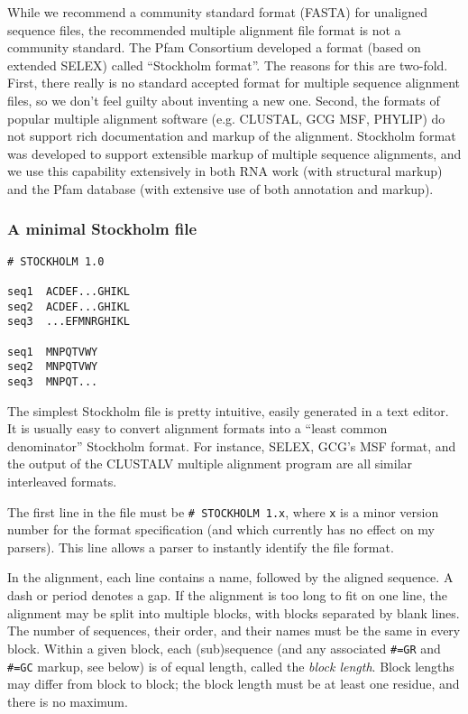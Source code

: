 While we recommend a community standard format (FASTA) for unaligned
sequence files, the recommended multiple alignment file format is not
a community standard.  The Pfam Consortium developed a format (based
on extended SELEX) called ``Stockholm format''.  The reasons for this
are two-fold. First, there really is no standard accepted format for
multiple sequence alignment files, so we don't feel guilty about
inventing a new one. Second, the formats of popular multiple alignment
software (e.g. CLUSTAL, GCG MSF, PHYLIP) do not support rich
documentation and markup of the alignment.  Stockholm format was
developed to support extensible markup of multiple sequence
alignments, and we use this capability extensively in both RNA work
(with structural markup) and the Pfam database (with extensive use of
both annotation and markup).

\subsubsection{A minimal Stockholm file}
\begin{verbatim}
# STOCKHOLM 1.0

seq1  ACDEF...GHIKL
seq2  ACDEF...GHIKL
seq3  ...EFMNRGHIKL

seq1  MNPQTVWY
seq2  MNPQTVWY
seq3  MNPQT...

\end{verbatim}

The simplest Stockholm file is pretty intuitive, easily generated in a
text editor. It is usually easy to convert alignment formats into a
``least common denominator'' Stockholm format. For instance, SELEX,
GCG's MSF format, and the output of the CLUSTALV multiple alignment
program are all similar interleaved formats.

The first line in the file must be \verb+# STOCKHOLM 1.x+, where
\verb+x+ is a minor version number for the format specification
(and which currently has no effect on my parsers). This line allows a
parser to instantly identify the file format.

In the alignment, each line contains a name, followed by the aligned
sequence. A dash or period denotes a gap. If the alignment is too long
to fit on one line, the alignment may be split into multiple blocks,
with blocks separated by blank lines. The number of sequences, their
order, and their names must be the same in every block. Within a given
block, each (sub)sequence (and any associated \verb+#=GR+ and
\verb+#=GC+ markup, see below) is of equal length, called the
\textit{block length}. Block lengths may differ from block to block;
the block length must be at least one residue, and there is no
maximum.  

